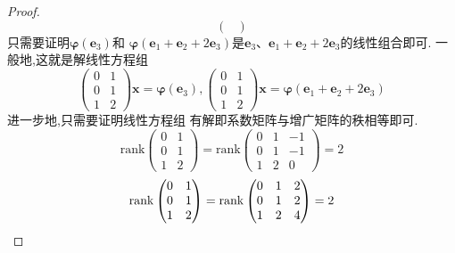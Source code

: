 {\begin{proof}
\[\begin{pmatrix}
            \end{pmatrix}
        \]
        只需要证明$\bm{\varphi}\left(\bm{e}_3\right)$和
        $\bm{\varphi}\left(\bm{e}_1+\bm{e}_2+2
            \bm{e}_3\right)$是$\bm{e}_3$、$\bm{e}_1
            +\bm{e}_2+2\bm{e}_3$的线性组合即可. 一般地,这就是解线性方程组
        \[
            \begin{pmatrix}
                0 & 1 \\0&1\\1&2
            \end{pmatrix}\bm{x}=\bm{\varphi}\left(\bm{e}_3\right)
            ,
            \begin{pmatrix}
                0 & 1 \\0&1\\1&2
            \end{pmatrix}\bm{x}=\bm{\varphi}\left(\bm{e}_1+\bm{e}_2+2\bm{e}_3\right)
        \]
        进一步地,只需要证明线性方程组
        有解即系数矩阵与增广矩阵的秩相等即可.
        \[
            \mathrm{rank}\begin{pmatrix}
                0 & 1 \\0&1\\1&2
            \end{pmatrix}=\mathrm{rank}\begin{pmatrix}
                0 & 1 & -1 \\0&1&-1\\1&2&0
            \end{pmatrix}=2
        \]
        \[
            \mathrm{rank}\begin{pmatrix}
                0 & 1 \\0&1\\1&2
            \end{pmatrix}=\mathrm{rank}\begin{pmatrix}
                0 & 1 & 2 \\0&1&2\\1&2&4
            \end{pmatrix}=2
            \qedhere
        \]
    \end{proof}
}